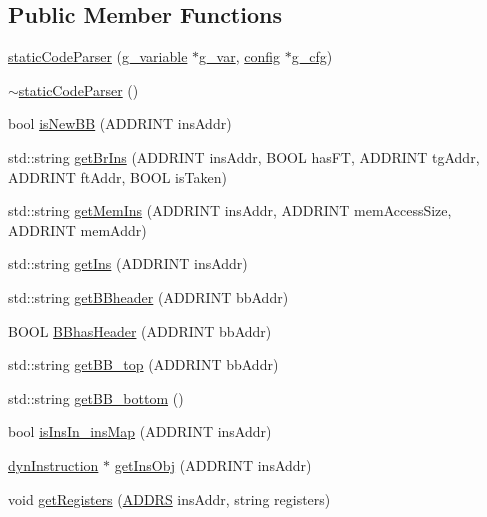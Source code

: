 \subsection*{Public Member Functions}
\begin{DoxyCompactItemize}
\item 
\hyperlink{classstaticCodeParser_a5eaad2527b293e52712df9f2d29cdfef}{staticCodeParser} (\hyperlink{structg__variable}{g\_\-variable} $\ast$\hyperlink{g__variable_8h_adfd3dddc03cc8a61d5ba0f266d7caeaa}{g\_\-var}, \hyperlink{classconfig}{config} $\ast$\hyperlink{pars_8cpp_ac300c5dd1553141a19aac3739ab59c78}{g\_\-cfg})
\item 
\hyperlink{classstaticCodeParser_a21c3a8c803545fe616cf63879ed6e6df}{$\sim$staticCodeParser} ()
\item 
bool \hyperlink{classstaticCodeParser_a8faa5c05cefb98fbcee6b160392c0756}{isNewBB} (ADDRINT insAddr)
\item 
std::string \hyperlink{classstaticCodeParser_a87051ae0224cfa3278f1f395bb1d6ffd}{getBrIns} (ADDRINT insAddr, BOOL hasFT, ADDRINT tgAddr, ADDRINT ftAddr, BOOL isTaken)
\item 
std::string \hyperlink{classstaticCodeParser_aa79cb891e4a6c1596410fbc025552e4b}{getMemIns} (ADDRINT insAddr, ADDRINT memAccessSize, ADDRINT memAddr)
\item 
std::string \hyperlink{classstaticCodeParser_aad7f9347c84fad935e5c10e9654b9518}{getIns} (ADDRINT insAddr)
\item 
std::string \hyperlink{classstaticCodeParser_a9041ba47fb240605dbffac8546931d19}{getBBheader} (ADDRINT bbAddr)
\item 
BOOL \hyperlink{classstaticCodeParser_aa26ce7946cda25e79e4e3c1562f426ee}{BBhasHeader} (ADDRINT bbAddr)
\item 
std::string \hyperlink{classstaticCodeParser_aea51c05ad3592ff1a56eb560c27ac9c5}{getBB\_\-top} (ADDRINT bbAddr)
\item 
std::string \hyperlink{classstaticCodeParser_a4f97fe1c21b37d063ae129b5895f63c1}{getBB\_\-bottom} ()
\item 
bool \hyperlink{classstaticCodeParser_aec2b31f34e15b47157a752d3259ace92}{isInsIn\_\-insMap} (ADDRINT insAddr)
\item 
\hyperlink{classdynInstruction}{dynInstruction} $\ast$ \hyperlink{classstaticCodeParser_a141b5cea134e6e4acae6784d737daa5c}{getInsObj} (ADDRINT insAddr)
\item 
void \hyperlink{classstaticCodeParser_ad5a50456d0150c4ef57d7f3c946c6d8a}{getRegisters} (\hyperlink{global_2global_8h_a7ea74bb9ffd2e4d41550ae2383dd25bc}{ADDRS} insAddr, string registers)
\end{DoxyCompactItemize}


